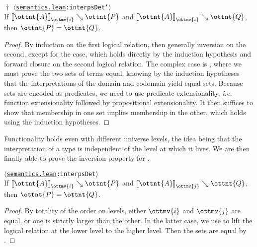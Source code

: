 \documentclass[a4paper,UKenglish,cleveref,autoref,thm-restate]{lipics-v2021}
\makeatletter
\newcommand{\repo}{https://github.com/ionathanch/TTBFL}
\newcommand{\ie}{\textit{i.e.}\@\xspace}
\newcommand{\thmref}[2]{%
  $\langle$\href{\repo/tree/main/src/#1}{\texttt{#1}}\texttt{:#2}$\rangle$%
}
\makeatother
\begin{document}
\begin{lemma}$\!\!{\dagger}$ \thmref{semantics.lean}{interpsDet'} \label{lem:lr:fixed-func} \\
  If $ \mathopen{\llbracket}  \ottnt{A}  \mathclose{\rrbracket}_{ \ottmv{i} } \searrow  \ottnt{P} $ and $ \mathopen{\llbracket}  \ottnt{A}  \mathclose{\rrbracket}_{ \ottmv{i} } \searrow  \ottnt{Q} $, then $\ottnt{P} = \ottnt{Q}$.
\end{lemma}

\begin{proof}
  By induction on the first logical relation,
  then generally inversion on the second,
  except for the  case,
  which holds directly by the induction hypothesis
  and forward closure on the second logical relation.
  The complex case is ,
  where we must prove the two sets of terms equal,
  knowing by the induction hypotheses
  that the interpretations of the domain and codomain yield equal sets.
  Because sets are encoded as predicates,
  we need to use predicate extensionality,
  \ie function extensionality followed by propositional extensionality.
  It then suffices to show that membership in one set implies membership in the other,
  which holds using the induction hypotheses.
\end{proof}

Functionality holds even with different universe levels,
the idea being that the interpretation of a type is independent
of the level at which it lives.
We are then finally able to prove the inversion property for .

\begin{lemma}[Functionality (l.r.)] \thmref{semantics.lean}{interpsDet} \label{lem:lr:func} \\
  If $ \mathopen{\llbracket}  \ottnt{A}  \mathclose{\rrbracket}_{ \ottmv{i} } \searrow  \ottnt{P} $ and $ \mathopen{\llbracket}  \ottnt{A}  \mathclose{\rrbracket}_{ \ottmv{j} } \searrow  \ottnt{Q} $, then $\ottnt{P} = \ottnt{Q}$.
\end{lemma}

\begin{proof}
  By totality of the order on levels,
  either $\ottmv{i}$ and $\ottmv{j}$ are equal,
  or one is strictly larger than the other.
  In the latter case,
  we use  to lift the logical relation at the lower level to the higher level.
  Then the sets are equal by .
\end{proof}
\end{document}
